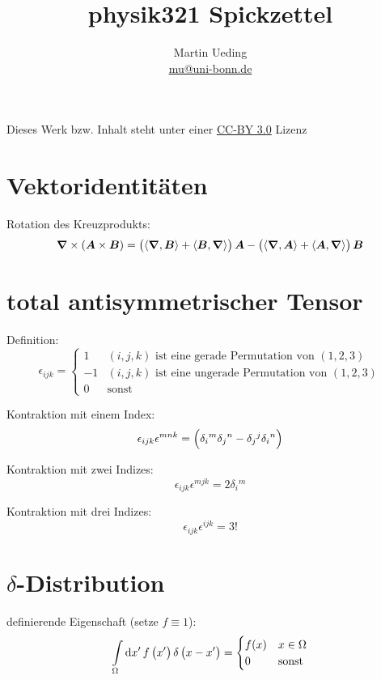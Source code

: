 

\hypersetup{
	pdftitle=
}


\title{physik321 Spickzettel}
\author{
	Martin Ueding \\
	\small{\href{mailto:mu@uni-bonn.de}{mu@uni-bonn.de}}
}



\maketitle

Dieses Werk bzw. Inhalt steht unter einer
\href{https://creativecommons.org/licenses/by/3.0/}{CC-BY 3.0} Lizenz

\section{Vektoridentitäten}

Rotation des Kreuzprodukts:
\[
	\vnabla \times \del{\vec A \times \vec B}
	= \del{\divergence{\vec B} + \inner{\vec B}\vnabla} \vec A
	- \del{\divergence{\vec A} + \inner{\vec A}\vnabla} \vec B
\]


\section{total antisymmetrischer Tensor}

Definition:
\[
	\epsilon_{ijk}
	=
	\begin{cases}
		1 & \text{$(i, j, k)$ ist eine gerade Permutation von $(1, 2, 3)$} \\
		-1 & \text{$(i, j, k)$ ist eine ungerade Permutation von $(1, 2, 3)$} \\
		0 & \text{sonst}
	\end{cases}
\]

Kontraktion mit einem Index:
\[
	\epsilon_{ijk} \epsilon^{mnk} = \del{
		\delta_i{}^m \delta_j{}^n - \delta_j{}^j \delta_i{}^n
	}
\]

Kontraktion mit zwei Indizes:
\[
	\epsilon_{ijk} \epsilon^{mjk} = 2 \delta_i{}^m
\]

Kontraktion mit drei Indizes:
\[
	\epsilon_{ijk} \epsilon^{ijk} = 3!
\]

\section{$\delta$-Distribution}

definierende Eigenschaft (setze $f \equiv 1$):
\[
	\intop_\Omega \dif x' \, f\del{x'} \delta\del{x - x'}
	=
	\begin{cases}
		f(x) & x \in \Omega \\
		0 & \text{sonst}
	\end{cases}
\]

